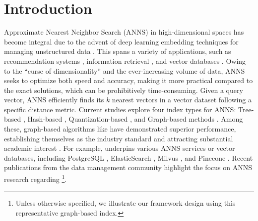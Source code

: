 \section{Introduction}
\label{sec: intro}
Approximate Nearest Neighbor Search (ANNS) in high-dimensional spaces has become integral due to the advent of deep learning embedding techniques for managing unstructured data \cite{Milvus_sigmod2021,graph_survey_vldb2021,tau-MG,RaBitQ}. This spans a variety of applications, such as recommendation systems \cite{ChenLZWLMHJXDZ22,HanZYXCS23}, information retrieval \cite{GouDWK24,WangMW22}, and vector databases \cite{VDB_tutorial_SIGMOD24,Manu_zilliz}. 
Owing to the ``curse of dimensionality'' and the ever-increasing volume of data, ANNS seeks to optimize both speed and accuracy, making it more practical compared to the exact solutions, which can be prohibitively time-consuming.
Given a query vector, ANNS efficiently finds its $k$ nearest vectors in a vector dataset following a specific distance metric. 
Current studies explore four index types for ANNS: Tree-based \cite{AroraSK018,LuWWK20}, Hash-based \cite{HuangFZFN15,ZhaoZYLXZJ23}, Quantization-based \cite{PQ,PQfast}, and Graph-based methods \cite{NSG,HVS}. 
Among these, graph-based algorithms like  \cite{HNSW} have demonstrated superior performance, establishing themselves as the industry standard \cite{lanns,es_hnsw,douze2024faiss} and attracting substantial academic interest \cite{ADSampling,HM_ANN,LiZAH20}.
For example,  underpins various ANNS services or vector databases, including PostgreSQL \cite{PASE}, ElasticSearch \cite{es_hnsw}, Milvus \cite{Milvus_sigmod2021}, and Pinecone \cite{pinecone_hnsw}. 
Recent publications from the data management community \cite{sigmod_24_papers, vldb_24_papers, icde_24_papers} highlight the focus on ANNS research regarding \footnote{Unless otherwise specified, we illustrate our framework design using this representative graph-based index.}.

